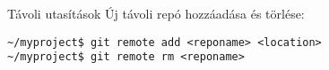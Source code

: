 
\begin{frame}[fragile]{Távoli utasítások}
    \pause
    Új távoli repó hozzáadása és törlése:
\small\begin{verbatim}
~/myproject$ git remote add <reponame> <location>
~/myproject$ git remote rm <reponame>
\end{verbatim}\normalsize
\end{frame}

